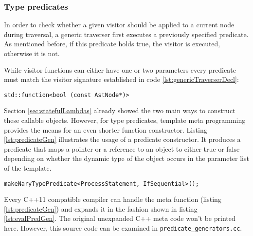 \subsubsection{Type predicates}
\label{sec:typePred}

In order to check whether a given visitor should be applied to a
current node during traversal, a generic traverser first executes a
previously specified predicate. As mentioned before, if this predicate
holds true, the visitor is executed, otherwise it is not.

While visitor functions can either have one or two parameters
every predicate must match the visitor signature established in
code \ref{lst:genericTraverserDecl}:
\begin{lstlisting}[style=c++]
std::function<bool (const AstNode*)>
\end{lstlisting}

Section \ref{sec:statefulLambdas} already showed the two main ways to
construct these callable objects. However, for type predicates,
template meta programming provides the means for an even shorter
function constructor. Listing \ref{lst:predicateGen} illustrates the
usage of a predicate constructor. It produces a predicate that maps a
pointer or a reference to an object to either true or false depending
on whether the dynamic type of the object occurs in the parameter list
of the  template.
%
\begin{lstlisting}[style=c++,caption={N-ary predicate
      generator},label={lst:predicateGen}]
makeNaryTypePredicate<ProcessStatement, IfSequential>();
\end{lstlisting}
%
Every C++11 compatible compiler can handle the meta function (listing
\ref{lst:predicateGen}) and
expands it in the fashion shown in listing \ref{lst:evalPredGen}. The
original unexpanded C++ meta code won't be printed here. However, this
source code can be examined in \texttt{predicate_generators.cc}.

